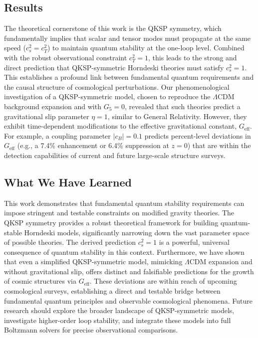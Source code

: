 \documentclass[twocolumn]{aastex631}
\begin{document}
\subsection{Results}
The theoretical cornerstone of this work is the QKSP symmetry, which fundamentally implies that scalar and tensor modes must propagate at the same speed ($c_s^2 = c_T^2$) to maintain quantum stability at the one-loop level. Combined with the robust observational constraint $c_T^2=1$, this leads to the strong and direct prediction that QKSP-symmetric Horndeski theories must satisfy $c_s^2=1$. This establishes a profound link between fundamental quantum requirements and the causal structure of cosmological perturbations. Our phenomenological investigation of a QKSP-symmetric model, chosen to reproduce the $\Lambda$CDM background expansion and with $G_5=0$, revealed that such theories predict a gravitational slip parameter $\eta=1$, similar to General Relativity. However, they exhibit time-dependent modifications to the effective gravitational constant, $G_{\text{eff}}$. For example, a coupling parameter $|c_B|=0.1$ predicts percent-level deviations in $G_{\text{eff}}$ (e.g., a 7.4\% enhancement or 6.4\% suppression at $z=0$) that are within the detection capabilities of current and future large-scale structure surveys.

\subsection{What We Have Learned}
This work demonstrates that fundamental quantum stability requirements can impose stringent and testable constraints on modified gravity theories. The QKSP symmetry provides a robust theoretical framework for building quantum-stable Horndeski models, significantly narrowing down the vast parameter space of possible theories. The derived prediction $c_s^2=1$ is a powerful, universal consequence of quantum stability in this context. Furthermore, we have shown that even a simplified QKSP-symmetric model, mimicking $\Lambda$CDM expansion and without gravitational slip, offers distinct and falsifiable predictions for the growth of cosmic structures via $G_{\text{eff}}$. These deviations are within reach of upcoming cosmological surveys, establishing a direct and testable bridge between fundamental quantum principles and observable cosmological phenomena. Future research should explore the broader landscape of QKSP-symmetric models, investigate higher-order loop stability, and integrate these models into full Boltzmann solvers for precise observational comparisons.

{}

\end{document}

